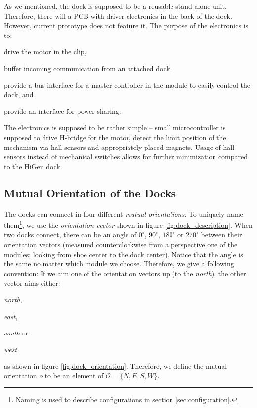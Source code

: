 As we mentioned, the dock is supposed to be a reusable stand-alone unit.
Therefore, there will a PCB with driver electronics in the back of the dock.
However, current prototype does not feature it. The purpose of the electronics
is to:
\begin{enumerate*}
    \item drive the motor in the clip,
    \item buffer incoming communication from an attached dock,
    \item provide a bus interface for a master controller in the module to
    easily control the dock, and
    \item provide an interface for power sharing.
\end{enumerate*}
The electronics is supposed to be rather simple -- small microcontroller is
supposed to drive H-bridge for the motor, detect the limit position of the
mechanism via hall sensors and appropriately placed magnets. Usage of hall
sensors instead of mechanical switches allows for further minimization compared
to the HiGen dock.

\subsection{Mutual Orientation of the Docks}\label{sec:mutual_orientation}

The docks can connect in four different \emph{mutual orientations}. To uniquely
name them\footnote{Naming is used to describe configurations in section
\ref{sec:configuration}.}, we use the \emph{orientation vector} shown in figure
\ref{fig:dock_description}. When two docks connect, there can be an angle of
$0^\circ$, $90^\circ$, $180^\circ$ or $270^\circ$ between their orientation
vectors (measured counterclockwise from a perspective one of the modules;
looking from shoe center to the dock center). Notice that the angle is the same
no matter which module we choose. Therefore, we give a following convention: If
we aim one of the orientation vectors up (to the \emph{north}), the other vector
aims either:
\begin{enumerate*}
    \item \emph{north},
    \item \emph{east},
    \item \emph{south} or
    \item \emph{west}
\end{enumerate*}
as shown in figure \ref{fig:dock_orientation}. Therefore, we define the mutual
orientation $o$ to be an element of $\mathcal{O} = \{N, E, S, W\}$.

